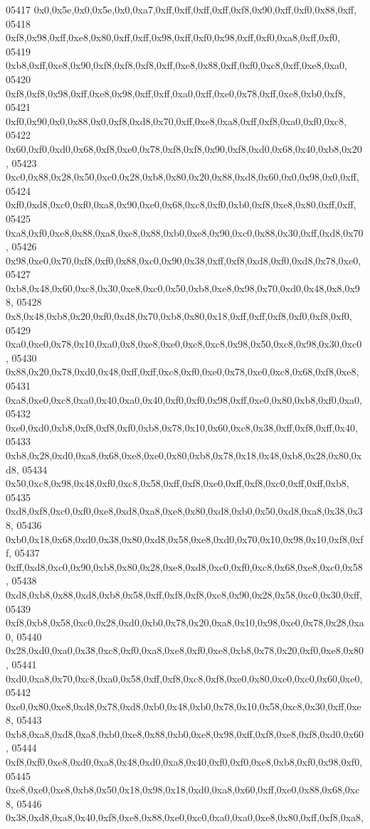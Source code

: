 \begin{DoxyCode}
05417   0x0,0x5e,0x0,0x5e,0x0,0xa7,0xff,0xff,0xff,0xff,0xf8,0x90,0xff,0xf0,0x88,0xff,
05418   0xf8,0x98,0xff,0xe8,0x80,0xff,0xff,0x98,0xff,0xf0,0x98,0xff,0xf0,0xa8,0xff,0xf0,
05419   0xb8,0xff,0xe8,0x90,0xf8,0xf8,0xf8,0xff,0xe8,0x88,0xff,0xf0,0xc8,0xff,0xe8,0xa0,
05420   0xf8,0xf8,0x98,0xff,0xe8,0x98,0xff,0xff,0xa0,0xff,0xe0,0x78,0xff,0xe8,0xb0,0xf8,
05421   0xf0,0x90,0x0,0x88,0x0,0xf8,0xd8,0x70,0xff,0xe8,0xa8,0xff,0xf8,0xa0,0xf0,0xc8,
05422   0x60,0xf0,0xd0,0x68,0xf8,0xe0,0x78,0xf8,0xf8,0x90,0xf8,0xd0,0x68,0x40,0xb8,0x20,
05423   0xc0,0x88,0x28,0x50,0xc0,0x28,0xb8,0x80,0x20,0x88,0xd8,0x60,0x0,0x98,0x0,0xff,
05424   0xf0,0xd8,0xc0,0xf0,0xa8,0x90,0xe0,0x68,0xc8,0xf0,0xb0,0xf8,0xe8,0x80,0xff,0xff,
05425   0xa8,0xf0,0xe8,0x88,0xa8,0xe8,0x88,0xb0,0xe8,0x90,0xc0,0x88,0x30,0xff,0xd8,0x70,
05426   0x98,0xe0,0x70,0xf8,0xf0,0x88,0xc0,0x90,0x38,0xff,0xf8,0xd8,0xf0,0xd8,0x78,0xe0,
05427   0xb8,0x48,0x60,0xc8,0x30,0xe8,0xc0,0x50,0xb8,0xe8,0x98,0x70,0xd0,0x48,0x8,0x98,
05428   0x8,0x48,0xb8,0x20,0xf0,0xd8,0x70,0xb8,0x80,0x18,0xff,0xff,0xf8,0xf0,0xf8,0xf0,
05429   0xa0,0xe0,0x78,0x10,0xa0,0x8,0xe8,0xe0,0xc8,0xc8,0x98,0x50,0xc8,0x98,0x30,0xc0,
05430   0x88,0x20,0x78,0xd0,0x48,0xff,0xff,0xc8,0xf0,0xe0,0x78,0xe0,0xc8,0x68,0xf8,0xe8,
05431   0xa8,0xe0,0xc8,0xa0,0x40,0xa0,0x40,0xf0,0xf0,0x98,0xff,0xe0,0x80,0xb8,0xf0,0xa0,
05432   0xe0,0xd0,0xb8,0xf8,0xf8,0xf0,0xb8,0x78,0x10,0x60,0xc8,0x38,0xff,0xf8,0xff,0x40,
05433   0xb8,0x28,0xd0,0xa8,0x68,0xe8,0xe0,0x80,0xb8,0x78,0x18,0x48,0xb8,0x28,0x80,0xd8,
05434   0x50,0xc8,0x98,0x48,0xf0,0xc8,0x58,0xff,0xf8,0xe0,0xff,0xf8,0xc0,0xff,0xff,0xb8,
05435   0xd8,0xf8,0xc0,0xf0,0xe8,0xd8,0xa8,0xe8,0x80,0xd8,0xb0,0x50,0xd8,0xa8,0x38,0x38,
05436   0xb0,0x18,0x68,0xd0,0x38,0x80,0xd8,0x58,0xe8,0xd0,0x70,0x10,0x98,0x10,0xf8,0xff,
05437   0xff,0xd8,0xc0,0x90,0xb8,0x80,0x28,0xe8,0xd8,0xc0,0xf0,0xc8,0x68,0xe8,0xc0,0x58,
05438   0xd8,0xb8,0x88,0xd8,0xb8,0x58,0xff,0xf8,0xf8,0xc8,0x90,0x28,0x58,0xc0,0x30,0xff,
05439   0xf8,0xb8,0x58,0xc0,0x28,0xd0,0xb0,0x78,0x20,0xa8,0x10,0x98,0xe0,0x78,0x28,0xa0,
05440   0x28,0xd0,0xa0,0x38,0xc8,0xf0,0xa8,0xe8,0xf0,0xe8,0xb8,0x78,0x20,0xf0,0xe8,0x80,
05441   0xd0,0xa8,0x70,0xc8,0xa0,0x58,0xff,0xf8,0xc8,0xf8,0xe0,0x80,0xe0,0xc0,0x60,0xe0,
05442   0xc0,0x80,0xe8,0xd8,0x78,0xd8,0xb0,0x48,0xb0,0x78,0x10,0x58,0xc8,0x30,0xff,0xe8,
05443   0xb8,0xa8,0xd8,0xa8,0xb0,0xe8,0x88,0xb0,0xe8,0x98,0xff,0xf8,0xe8,0xf8,0xd0,0x60,
05444   0xf8,0xf0,0xe8,0xd0,0xa8,0x48,0xd0,0xa8,0x40,0xf0,0xf0,0xe8,0xb8,0xf0,0x98,0xf0,
05445   0xe8,0xe0,0xe8,0xb8,0x50,0x18,0x98,0x18,0xd0,0xa8,0x60,0xff,0xe0,0x88,0x68,0xc8,
05446   0x38,0xd8,0xa8,0x40,0xf8,0xe8,0x88,0xe0,0xc0,0xa0,0xa0,0xe8,0x80,0xff,0xf8,0xa8,

\end{DoxyCode}
